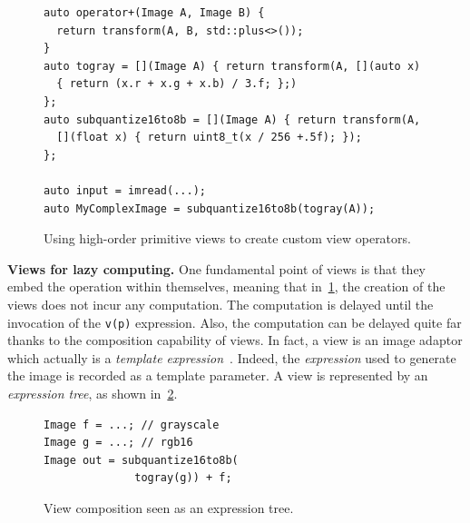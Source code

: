 \begin{figure}
  \noindent
  \begin{verbatim}
auto operator+(Image A, Image B) {
  return transform(A, B, std::plus<>());
}
auto togray = [](Image A) { return transform(A, [](auto x)
  { return (x.r + x.g + x.b) / 3.f; };)
};
auto subquantize16to8b = [](Image A) { return transform(A,
  [](float x) { return uint8_t(x / 256 +.5f); });
};

auto input = imread(...);
auto MyComplexImage = subquantize16to8b(togray(A));
  \end{verbatim}

  \caption{Using high-order primitive views to create custom view operators.}
  \label{fig.view.highorder}
\end{figure}

\textbf{Views for lazy computing.} One fundamental point of views is that they embed the operation within themselves,
meaning that in~\cref{fig.view.highorder}, the creation of the views does not incur any computation. The computation is
delayed until the invocation of the \texttt{v(p)} expression. Also, the computation can be delayed quite far thanks to
the composition capability of views. In fact, a view is an image adaptor which actually is a \emph{template
  expression}~\citep{veldhuizen.1995.expression, veldhuizen.2000.blitz}. Indeed, the \emph{expression} used to generate
the image is recorded as a template parameter. A view is represented by an \emph{expression tree}, as shown
in~\cref{fig.view.ast}.


\begin{figure}
  \null\hfill
  \begin{minipage}[b]{2cm}
    
  \end{minipage}
  \begin{minipage}[b]{5.5cm}
    \begin{verbatim}
Image f = ...; // grayscale
Image g = ...; // rgb16
Image out = subquantize16to8b(
              togray(g)) + f;
\end{verbatim}
  \end{minipage}
  \caption{View composition seen as an expression tree.}
  \label{fig.view.ast}
\end{figure}





